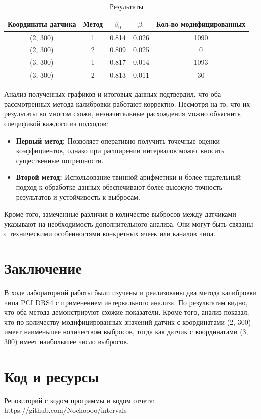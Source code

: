 \documentclass[a4paper,14pt]{extarticle}
\begin{document}
\begin{table}[htbp]
    \centering
    \caption{Результаты}
    \label{tab:sensor_results}
    \small %
    \begin{tabular}{ccccc}
    \toprule
    \textbf{Координаты датчика} & \textbf{Метод} & \boldmath$\beta_0$ & \boldmath$\beta_1$ & \textbf{Кол-во модифицированных} \\
    \midrule
    (2, 300) & 1 & 0.814 & 0.026 & 1090 \\
    (2, 300) & 2 & 0.809 & 0.025 & 0 \\
    (3, 300) & 1 & 0.817 & 0.014 & 1093 \\
    (3, 300) & 2 & 0.813 & 0.011 & 30 \\
    \bottomrule
\end{tabular}
\end{table}

Анализ полученных графиков и итоговых данных подтвердил, что оба рассмотренных метода калибровки работают корректно. Несмотря на то, что их результаты во многом схожи, незначительные расхождения можно объяснить спецификой каждого из подходов:

\begin{itemize}
\item \textbf{Первый метод:} Позволяет оперативно получить точечные оценки коэффициентов, однако при расширении интервалов может вносить существенные погрешности.
\item \textbf{Второй метод:} Использование твинной арифметики и более тщательный подход к обработке данных обеспечивают более высокую точность результатов и устойчивость к выбросам.
\end{itemize}

Кроме того, замеченные различия в количестве выбросов между датчиками указывают на необходимость дополнительного анализа. Они могут быть связаны с техническими особенностями конкретных ячеек или каналов чипа.

\section*{Заключение}

В ходе лабораторной работы были изучены и реализованы два метода калибровки чипа PCI DRS4 с применением интервального анализа. По результатам видно, что оба метода демонстрируют схожие показатели. Кроме того, анализ показал, что по количеству модифицированных значений датчик с координатами (2, 300) имеет наименьшее количеством выбросов, тогда как датчик с координатами (3, 300) имеет наибольшее число выбросов.

\section{Код и ресурсы}
Репозиторий с кодом программы и кодом отчета:\\
https://github.com/Nochoooo/intervals
\end{document}

